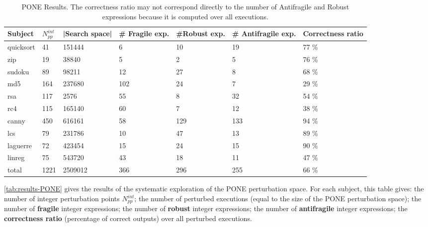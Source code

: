 \begin{table}[h]
	\caption{PONE Results. The correctness ratio may not correspond directly to the number of Antifragile and Robust expressions because it is computed over all executions.}
	\label{tab:results-PONE}
	\def\arraystretch{0.55}%
	\setlength\tabcolsep{0.45pt} %
	\centering\begin{tabular}{lllllll}
		\toprule
		Subject & $N^{int}_{pp}$ & |Search space| & \# Fragile exp. & \#Robust exp.& \# Antifragile exp. & Correctness ratio\\
		\midrule
		quicksort&41&151444&6&10&19&\textendash\textendash\textendash\textendash\textendash\textendash\textendash { }  77 \%\\
		zip&19&38840&5&2&5&\textendash\textendash\textendash\textendash\textendash\textendash\textendash { }  76 \%\\
		sudoku&89&98211&12&27&8&\textendash\textendash\textendash\textendash\textendash\textendash { }  68 \%\\
		md5&164&237680&102&24&7&\textendash\textendash { }  29 \%\\
		rsa&117&2576&55&8&32&\textendash\textendash\textendash\textendash\textendash { }  54 \%\\
		rc4&115&165140&60&7&12&\textendash\textendash\textendash { }  38 \%\\
		canny&450&616161&58&129&133&\textendash\textendash\textendash\textendash\textendash\textendash\textendash\textendash\textendash { }  94 \%\\
		lcs&79&231786&10&47&13&\textendash\textendash\textendash\textendash\textendash\textendash\textendash\textendash { }  89 \%\\
		laguerre&72&423454&15&24&15&\textendash\textendash\textendash\textendash\textendash\textendash\textendash\textendash\textendash { }  90 \%\\
		linreg&75&543720&43&18&11&\textendash\textendash\textendash\textendash { }  47 \%\\
		total & 1221&2509012&366&296&255&\textendash\textendash\textendash\textendash\textendash\textendash { }  66 \%\\
		\bottomrule
	\end{tabular}
\end{table}

\autoref{tab:results-PONE} gives the results of the systematic exploration of the PONE perturbation space.
For each subject, this table gives:
the number of integer perturbation points $N^{int}_{pp}$;
the number of perturbed executions (equal to the size of the PONE perturbation space);
the number of \textbf{fragile} integer expressions;
the number of \textbf{robust} integer expressions;
the number of \textbf{antifragile} integer expressions;
the \textbf{correctness ratio} (percentage of correct outputs) over all perturbed executions.

